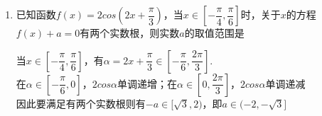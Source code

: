 \begin{enumerate}
\begin{enumerate}
\begin{jieda}
        \end{jieda}
        \item 已知函数$f(x) = 2cos(2x+\dfrac{\pi}{3})$，当$x \in [-\dfrac{\pi}{4}, \dfrac{\pi}{6}]$时，关于$x$的方程$f(x) + a = 0$有两个实数根，则实数$a$的取值范围是\blkda{$(-2, -\sqrt{3}]$}
        \begin{jieda}
            当$x \in [-\dfrac{\pi}{4}, \dfrac{\pi}{6}]$，有$\alpha = 2x+\dfrac{\pi}{3} \in [-\dfrac{\pi}{6}, \dfrac{2\pi}{3}]$. \\
            在$\alpha \in [-\dfrac{\pi}{6}, 0]$，$2cos\alpha$单调递增；在$\alpha \in [0, \dfrac{2\pi}{3}]$，$2cos\alpha$单调递减 \\
            因此要满足有两个实数根则有$-a \in [\sqrt{3}, 2)$，即$a \in (-2, -\sqrt{3}]$
        \end{jieda}
        

\end{enumerate}
\end{enumerate}
